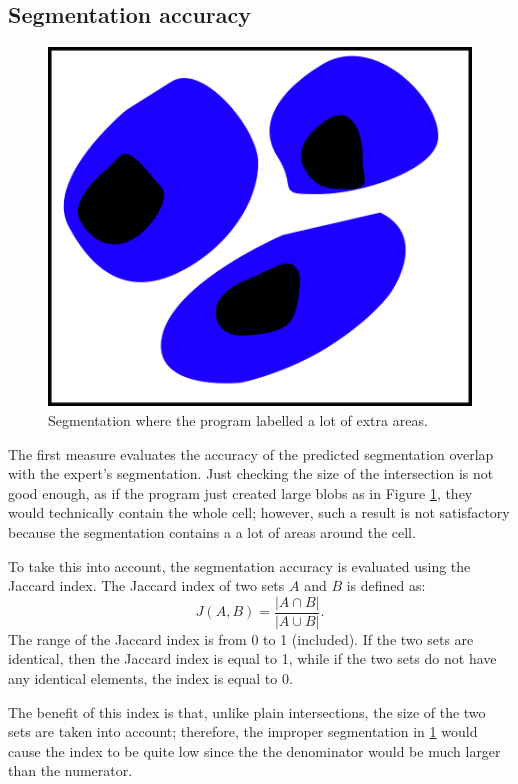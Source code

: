 \documentclass[
  digital,     %
  oneside,     %
  nosansbold,  %
  nocolorbold, %
  lof,         %
  lot,         %
]{fithesis4}
\begin{document}
\subsection{Segmentation accuracy}
\begin{figure}
    \begin{center}
        \includegraphics{resources/inkscape/evaluation_imprecise_segmentation.png}
    \end{center}
    \caption{Segmentation where the program labelled a lot of extra areas.}
    \label{fig:evaluation_imprecise}
\end{figure}
The first measure evaluates the accuracy of the predicted segmentation overlap
with the expert's segmentation. Just checking the size of the intersection is
not good enough, as if the program just created large blobs as in Figure
\ref{fig:evaluation_imprecise}, they would technically contain the whole cell;
however, such a result is not satisfactory because the segmentation contains a
a lot of areas around the cell.

To take this into account, the segmentation accuracy is evaluated using the
Jaccard index. The Jaccard index of two sets $A$ and $B$ is defined
as\cite{2020eelbode}:
$$J(A, B) = \frac{|A \cap B|}{|A \cup B|}.$$
The range of the Jaccard index is from 0 to 1 (included). If the two sets are
identical, then the Jaccard index is equal to 1, while if the two sets do not
have any identical elements, the index is equal to 0.

The benefit of this index is that, unlike plain intersections, the size of the two
sets are taken into account; therefore, the improper segmentation in
\ref{fig:evaluation_imprecise} would cause the index to be quite low since the
the denominator would be much larger than the numerator.
\end{document}
